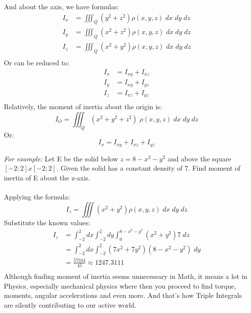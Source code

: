 \documentclass[a4paper]{article}
\begin{document}
	And about the axis, we have formulas:\\
	\begin{align*}
	I_x & = \iiint_Q (y^2 + z^2) \rho(x,y,z)\;dx\;dy\;dz \\
	I_y & = \iiint_Q (x^2 + z^2) \rho(x,y,z)\;dx\;dy\;dz \\
	I_z & = \iiint_Q (x^2 + y^2) \rho(x,y,z)\;dx\;dy\;dz \\
	\end{align*}
	Or can be reduced to:
	\begin{align*}
	I_x & = I_{xy} + I_{xz} \\
	I_y & = I_{xy} + I_{yz} \\
	I_z & = I_{xz} + I_{yz} \\
	\end{align*}
	Relatively, the moment of inertia about the origin is:
	\begin{equation*}
	I_O = \iiint_Q (x^2 + y^2 + z^2)\;\rho(x,y,z)\;dx\;dy\;dz
	\end{equation*}
	Or:
	\begin{equation*}
	I_x = I_{xy} + I_{xz} + I_{yz}
	\end{equation*}
	
	
	\textit{For example: }Let E be the solid below $z = 8 - x^2 - y^2$ and above the square $[-2;2]x[-2;2]$. Given the solid has a constant density of $7$. Find moment of inertia of E about the z-axis.\\\\
	Applying the formula: \\
	\begin{equation*}
	I_z = \iiint (x^2 + y^2) \rho(x,y,z)\;dx\;dy\;dz
	\end{equation*}
	Substitute the known values:
	\begin{align*}
	I_z & = \int_{-2}^{2}dx\int_{-2}^{2}dy\int_{0}^{8-x^2-y^2} (x^2 + y^2)7\;dz \\
	& = \int_{-2}^{2}dx\int_{-2}^{2}(7x^2 + 7y^2)(8-x^2-y^2)\;dy \\
	& = \frac{57344}{45} \approx 1247.3111 \\
	\end{align*}
	Although finding moment of inertia seems unnecessary in Math, it means a lot in Physics, especially mechanical physics where then you proceed to find torque, moments, angular accelerations and even more. And that's how Triple Integrals are silently contributing to our active world.
	
\end{document}
